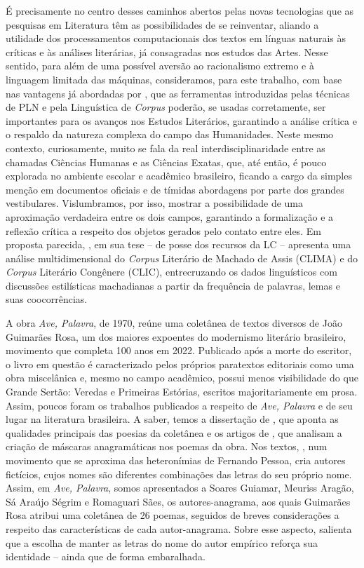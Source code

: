 \documentclass[portuguese]{textolivre}
\begin{document}
É precisamente no centro desses caminhos abertos pelas novas tecnologias que as pesquisas em Literatura têm as possibilidades de se reinventar, aliando a utilidade dos processamentos computacionais dos textos em línguas naturais às críticas e às análises literárias, já consagradas nos estudos das Artes. Nesse sentido, para além de uma possível aversão ao racionalismo extremo e à linguagem limitada das máquinas, consideramos, para este trabalho, com base nas vantagens já abordadas por \textcite{finatto_processamento_2015}, que as ferramentas introduzidas pelas técnicas de PLN e pela Linguística de \textit{Corpus} poderão, se usadas corretamente, ser importantes para os avanços nos Estudos Literários, garantindo a análise crítica e o respaldo da natureza complexa do campo das Humanidades. Neste mesmo contexto, curiosamente, muito se fala da real interdisciplinaridade entre as chamadas Ciências Humanas e as Ciências Exatas, que, até então, é pouco explorada no ambiente escolar e acadêmico brasileiro, ficando a cargo da simples menção em documentos oficiais e de tímidas abordagens por parte dos grandes vestibulares. Vislumbramos, por isso, mostrar a possibilidade de uma aproximação verdadeira entre os dois campos, garantindo a formalização e a reflexão crítica a respeito dos objetos gerados pelo contato entre eles. Em proposta parecida, \textcite{kauffmann_linguistica_2020}, em sua tese – de posse dos recursos da LC – apresenta uma análise multidimensional do \textit{Corpus} Literário de Machado de Assis (CLIMA) e do \textit{Corpus} Literário Congênere (CLIC), entrecruzando os dados linguísticos com discussões estilísticas machadianas a partir da frequência de palavras, lemas e suas coocorrências.

A obra\textit{ Ave, Palavra}, de 1970, reúne uma coletânea de textos diversos de João Guimarães Rosa, um dos maiores expoentes do modernismo literário brasileiro, movimento que completa 100 anos em 2022. Publicado após a morte do escritor, o livro em questão é caracterizado pelos próprios paratextos editoriais como uma obra miscelânica e, mesmo no campo acadêmico, possui menos visibilidade do que Grande Sertão: Veredas e Primeiras Estórias, escritos majoritariamente em prosa. Assim, poucos foram os trabalhos publicados a respeito de \textit{Ave, Palavra} e de seu lugar na literatura brasileira. A saber, temos a dissertação de \textcite{rossi_as_2007}, que aponta as qualidades principais das poesias da coletânea e os artigos de \textcite{brito_aspectos_2012,vital_uma_2021}, que analisam a criação de máscaras anagramáticas nos poemas da obra. Nos textos, \textcite{rosa_ave_1985}, num movimento que se aproxima das heteronímias de Fernando Pessoa, cria autores fictícios, cujos nomes são diferentes combinações das letras do seu próprio nome. Assim, em \textit{Ave, Palavra}, somos apresentados a Soares Guiamar, Meuriss Aragão, Sá Araújo Ségrim e Romaguari Sães, os autores-anagrama, aos quais Guimarães Rosa atribui uma coletânea de 26 poemas, seguidos de breves considerações a respeito das características de cada autor-anagrama. Sobre esse aspecto, \textcite{brito_aspectos_2012} salienta que a escolha de manter as letras do nome do autor empírico reforça sua identidade – ainda que de forma embaralhada. 
\end{document}
